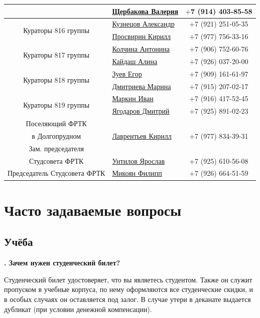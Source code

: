 \documentclass[14pt]{extarticle}
\newcounter{question}
\newcommand\Que[1]{%
    \begin{minipage}{\textwidth}
    \leavevmode\par
    \stepcounter{question}
    \noindent
    {\large\textbf{\thequestion. #1}}\par}
\newcommand\Ans[2][]{%
    \leavevmode\par\noindent
    {\leftskip37pt
    \textbf{#1}#2\par}
    \end{minipage}}
\begin{document}
\begin{center}
\begin{tabular}{ |c|l|c| }
& \href{https://vk.com/id157741664}{Щербакова Валерия} & $+$7 (914) 403-85-58 \\ \hline
\multirow{2}{*}{Кураторы 816 группы}
& \href{https://vk.com/id26853756}{Кузнецов Александр} & $+$7 (921) 251-05-35 \\ \cline{2-3}
& \href{https://vk.com/id74426746}{Просвирин Кирилл} & $+$7 (977) 756-33-16 \\ \hline
\multirow{2}{*}{Кураторы 817 группы}
& \href{https://vk.com/id26522337}{Колчина Антонина} & $+$7 (906) 752-60-76 \\ \cline{2-3}
& \href{https://vk.com/id250705057}{Кайдаш Алина} & $+$7 (926) 037-20-00 \\ \hline
\multirow{2}{*}{Кураторы 818 группы}
& \href{https://vk.com/id168598198}{Зуев Егор} & $+$7 (909) 161-61-97 \\ \cline{2-3}
& \href{https://vk.com/id60685214}{Дмитриева Марина} & $+$7 (915) 207-02-17 \\ \hline
\multirow{2}{*}{Кураторы 819 группы}
& \href{https://vk.com/id146543547}{Маркин Иван} & $+$7 (916) 417-52-45 \\ \cline{2-3}
& \href{https://vk.com/id127309589}{Ягодаров Дмитрий} & $+$7 (925) 891-02-23 \\ \hline \hline
Поселяющий ФРТК &&\\ в Долгопрудном & \href{https://vk.com/id255478108}{Лаврентьев Кирилл} & +7 (977) 834-39-31 \\ \hline
Зам. председателя &&\\ Студсовета ФРТК & \href{https://vk.com/yr.untilov}{Унтилов Ярослав} & +7 (925) 610-56-08 \\ \hline
Председатель Студсовета ФРТК & \href{https://vk.com/philalala}{Микоян Филипп} & +7 (926) 664-51-59 \\
\hline
\end{tabular}
\renewcommand{\arraystretch}{1}
\end{center}
\clearpage
\section{Часто задаваемые вопросы}
\setcounter{question}{0}
\subsection{Учёба}

\Que{Зачем нужен студенческий билет?}
\Ans{Студенческий билет удостоверяет, что вы являетесь студентом. Также он служит пропуском в учебные корпуса, по нему оформляются все студенческие скидки, и в особых случаях он оставляется под залог. В случае утери в деканате выдается дубликат (при условии денежной компенсации).}
\end{document}
